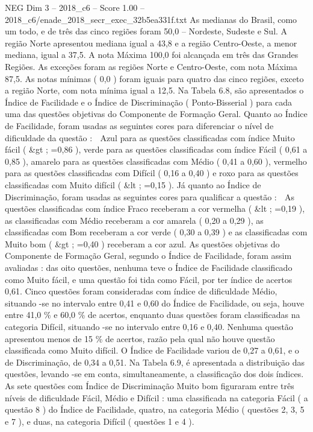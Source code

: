 \begin{textsample}{NEG Dim 3 – 2018\_c6 – Score 1.00 – 2018\_c6/enade\_2018\_secr\_exec\_32b5ea331f.txt}
As medianas do Brasil, como um todo, e de três das cinco regiões foram 50,0 – Nordeste, Sudeste e Sul.
A região Norte apresentou mediana igual a 43,8 e a região Centro-Oeste, a menor mediana, igual a 37,5.
A nota Máxima 100,0 foi alcançada em três das Grandes Regiões.
As exceções foram as regiões Norte e Centro-Oeste, com nota Máxima 87,5.
As notas mínimas ( 0,0 ) foram iguais para quatro das cinco regiões, exceto a região Norte, com nota mínima igual a 12,5.
Na Tabela 6.8, são apresentados o Índice de Facilidade e o Índice de Discriminação ( Ponto-Bisserial ) para cada uma das questões objetivas do Componente de Formação Geral.
Quanto ao Índice de Facilidade, foram usadas as seguintes cores para diferenciar o nível de dificuldade da questão :  Azul para as questões classificadas com índice Muito fácil ( \&gt ; =0,86 ), verde para as questões classificadas com índice Fácil ( 0,61 a 0,85 ), amarelo para as questões classificadas com Médio ( 0,41 a 0,60 ), vermelho para as questões classificadas com Difícil ( 0,16 a 0,40 ) e roxo para as questões classificadas com Muito difícil ( \&lt ; =0,15 ).
Já quanto ao Índice de Discriminação, foram usadas as seguintes cores para qualificar a questão :  As questões classificadas com índice Fraco receberam a cor vermelha ( \&lt ; =0,19 ), as classificadas com Médio receberam a cor amarela ( 0,20 a 0,29 ), as classificadas com Bom receberam a cor verde ( 0,30 a 0,39 ) e as classificadas com Muito bom ( \&gt ; =0,40 ) receberam a cor azul.
As questões objetivas do Componente de Formação Geral, segundo o Índice de Facilidade, foram assim avaliadas : das oito questões, nenhuma teve o Índice de Facilidade classificado como Muito fácil, e uma questão foi tida como Fácil, por ter índice de acertos 0,61.
Cinco questões foram consideradas com índice de dificuldade Médio, situando -se no intervalo entre 0,41 e 0,60 do Índice de Facilidade, ou seja, houve entre 41,0 \% e 60,0 \% de acertos, enquanto duas questões foram classificadas na categoria Difícil, situando -se no intervalo entre 0,16 e 0,40.
Nenhuma questão apresentou menos de 15 \% de acertos, razão pela qual não houve questão classificada como Muito difícil.
O Índice de Facilidade variou de 0,27 a 0,61, e o de Discriminação, de 0,34 a 0,51.
Na Tabela 6.9, é apresentada a distribuição das questões, levando -se em conta, simultaneamente, a classificação dos dois índices.
As sete questões com Índice de Discriminação Muito bom figuraram entre três níveis de dificuldade Fácil, Médio e Difícil : uma classificada na categoria Fácil ( a questão 8 ) do Índice de Facilidade, quatro, na categoria Médio ( questões 2, 3, 5 e 7 ), e duas, na categoria Difícil ( questões 1 e 4 ).

\end{textsample}

